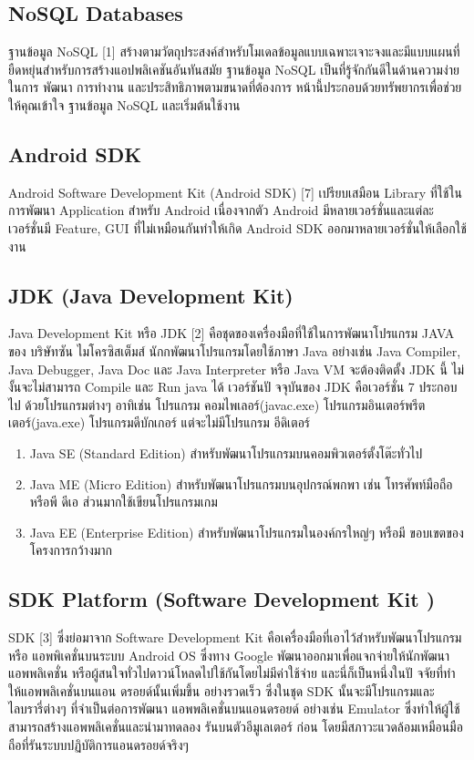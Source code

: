 \subsection{NoSQL Databases}
ฐานข้อมูล NoSQL [1] สร้างตามวัตถุประสงค์สําหรับโมเดลข้อมูลแบบเฉพาะเจาะจงและมีแบบแผนที่
ยืดหยุ่นสําหรับการสร้างแอปพลิเคชันอันทันสมัย ฐานข้อมูล NoSQL เป็นที่รู้จักกันดีในด้านความง่ายในการ
พัฒนา การทํางาน และประสิทธิภาพตามขนาดที่ต้องการ หน้านี้ประกอบด้วยทรัพยากรเพื่อช่วยให้คุณเข้าใจ
ฐานข้อมูล NoSQL และเริ่มต้นใช้งาน
\subsection{Android SDK}
Android Software Development Kit (Android SDK) [7] เปรียบเสมือน Library ที่ใช้ใน
การพัฒนา Application สําหรับ Android เนื่องจากตัว Android มีหลายเวอร์ชั่นและแต่ละเวอร์ชั่นมี
Feature, GUI ที่ไม่เหมือนกันทําให้เกิด Android SDK ออกมาหลายเวอร์ชั่นให้เลือกใช้งาน

\subsection{JDK (Java Development Kit)}
Java Development Kit หรือ JDK [2] คือชุดของเครื่องมือที่ใช้ในการพัฒนาโปรแกรม JAVA ของ
บริษัทซัน ไมโครซิสเต็มส์ นักกพัฒนาโปรแกรมโดยใช้ภาษา Java อย่างเช่น Java Compiler, Java Debugger, Java Doc และ Java Interpreter หรือ Java VM จะต้องติดตั้ง JDK นี้ ไม่ งั้นจะไม่สามารถ
Compile และ Run java ได้ เวอร์ชันปั จจุบันของ JDK คือเวอร์ชั่น 7 ประกอบไป ด้วยโปรแกรมต่างๆ
อาทิเช่น โปรแกรม คอมไพเลอร์(javac.exe) โปรแกรมอินเตอร์พรีตเตอร์(java.exe) โปรแกรมดีบักเกอร์
แต่จะไม่มีโปรแกรม อีดิเตอร์
\begin{enumerate}
  \item  Java SE (Standard Edition) สําหรับพัฒนาโปรแกรมบนคอมพิวเตอร์ตั้งโต๊ะทั่วไป
  
  \item  Java ME (Micro Edition) สําหรับพัฒนาโปรแกรมบนอุปกรณ์พกพา เช่น โทรศัพท์มือถือหรือพี
  ดีเอ ส่วนมากใช้เขียนโปรแกรมเกม
  
  \item Java EE (Enterprise Edition) สําหรับพัฒนาโปรแกรมในองค์กรใหญ่ๆ หรือมี ขอบเขตของโครงการกว้างมาก
\end{enumerate}
\subsection{SDK Platform (Software Development Kit )}
SDK [3] ซึ่งย่อมาจาก Software Development Kit คือเครื่องมือที่เอาไว้สําหรับพัฒนาโปรแกรมหรือ
แอพพิเคชั่นบนระบบ Android OS ซึ่งทาง Google พัฒนาออกมาเพื่อแจกจ่ายให้นักพัฒนาแอพพลิเคชั่น
หรือผู้สนใจทั่วไปดาวน์โหลดไปใช้กันโดยไม่มีค่าใช้จ่าย และนี่ก็เป็นหนึ่งในปั จจัยที่ทําให้แอพพลิเคชั่นบนแอน
ดรอยด์นั้นเพิ่มขึ้น อย่างรวดเร็ว ซึ่งในชุด SDK นั้นจะมีโปรแกรมและไลบรารี่ต่างๆ ที่จําเป็นต่อการพัฒนา
แอพพลิเคชั่นบนแอนดรอยด์ อย่างเช่น Emulator ซึ่งทําให้ผู้ใช้สามารถสร้างแอพพลิเคชั่นและนํามาทดลอง
รันบนตัวอีมูเลเตอร์ ก่อน โดยมีสภาวะแวดล้อมเหมือนมือถือที่รันระบบปฏิบัติการแอนดรอยด์จริงๆ
